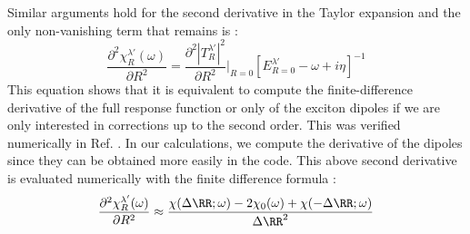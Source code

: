 Similar arguments hold for the second derivative in the Taylor expansion and the only non-vanishing term that remains is :
\begin{equation}
	\frac{\partial^2 \chi^{\lambda'}_R(\omega)}{\partial R^2} = \frac{\partial^2 |T^{\lambda'}_R|^2}{\partial R^2}\biggr|_{R=0} \left[ E^{\lambda'}_{R=0} - \omega + i\eta \right]^{-1} \label{eq:chi_fdd}
\end{equation}
This equation shows that it is equivalent to compute the finite-difference derivative of the full response function or only of the exciton dipoles if we are only interested in corrections up to the second order. This was verified numerically in Ref. \cite{paleari2019exciton}. In our calculations, we compute the derivative of the dipoles since they can be obtained more easily in the code. This above second derivative is evaluated numerically with the finite difference formula :
\begin{equation}
	\frac{\partial^2 \chi^{\lambda'}_R(\omega)}{\partial R^2} \approx \frac{\chi(\Delta\RR;\omega) - 2 \chi_0(\omega) + \chi(-\Delta\RR;\omega)}{\Delta\RR^2}
\end{equation}

